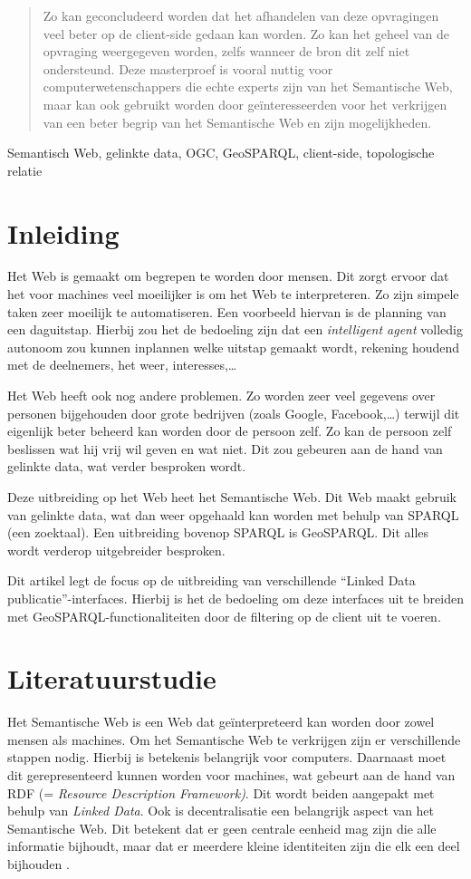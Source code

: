 \documentclass[twocolumn]{phdsymp} %
\begin{document}
\begin{abstract}
    Zo kan geconcludeerd worden dat het afhandelen van deze opvragingen veel beter op de client-side gedaan kan worden. Zo kan het geheel van de opvraging weergegeven worden, zelfs wanneer de bron dit zelf niet ondersteund. Deze masterproef is vooral nuttig voor computerwetenschappers die echte experts zijn van het Semantische Web, maar kan ook gebruikt worden door geïnteresseerden voor het verkrijgen van een beter begrip van het Semantische Web en zijn mogelijkheden.
\end{abstract}

\begin{keywords}
    Semantisch Web, gelinkte data, OGC, GeoSPARQL, client-side, topologische relatie
\end{keywords}

\section{Inleiding}
Het Web is gemaakt om begrepen te worden door mensen. Dit zorgt ervoor dat het voor machines veel moeilijker is om het Web te interpreteren. Zo zijn simpele taken zeer moeilijk te automatiseren. Een voorbeeld hiervan is de planning van een daguitstap. Hierbij zou het de bedoeling zijn dat een \textit{intelligent agent} volledig autonoom zou kunnen inplannen welke uitstap gemaakt wordt, rekening houdend met de deelnemers, het weer, interesses,\dots 

Het Web heeft ook nog andere problemen. Zo worden zeer veel gegevens over personen bijgehouden door grote bedrijven (zoals Google, Facebook,\dots) terwijl dit eigenlijk beter beheerd kan worden door de persoon zelf. Zo kan de persoon zelf beslissen wat hij vrij wil geven en wat niet. Dit zou gebeuren aan de hand van gelinkte data, wat verder besproken wordt.

Deze uitbreiding op het Web heet het Semantische Web. Dit Web maakt gebruik van gelinkte data, wat dan weer opgehaald kan worden met behulp van SPARQL (een zoektaal). Een uitbreiding bovenop SPARQL is GeoSPARQL. Dit alles wordt verderop uitgebreider besproken.

Dit artikel legt de focus op de uitbreiding van verschillende ``Linked Data publicatie''-interfaces. Hierbij is het de bedoeling om deze interfaces uit te breiden met GeoSPARQL-functionaliteiten door de filtering op de client uit te voeren.

\section{Literatuurstudie}
Het Semantische Web is een Web dat geïnterpreteerd kan worden door zowel mensen als machines. Om het Semantische Web te verkrijgen zijn er verschillende stappen nodig. Hierbij is betekenis belangrijk voor computers. Daarnaast moet dit gerepresenteerd kunnen worden voor machines, wat gebeurt aan de hand van RDF (= \textit{Resource Description Framework)}. Dit wordt beiden aangepakt met behulp van \textit{Linked Data}. Ook is decentralisatie een belangrijk aspect van het Semantische Web. Dit betekent dat er geen centrale eenheid mag zijn die alle informatie bijhoudt, maar dat er meerdere kleine identiteiten zijn die elk een deel bijhouden \cite{berners2001semantic}.
\end{document}
